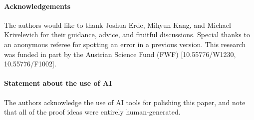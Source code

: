 \documentclass[notitlepage]{scrartcl}
\begin{document}
\paragraph{Acknowledgements}
The authors would like to thank Joshua Erde, Mihyun Kang, and Michael Krivelevich for their guidance, advice, and fruitful discussions.
Special thanks to an anonymous referee for spotting an error in a previous version.
This research was funded in part by the Austrian Science Fund (FWF) [10.55776/W1230, 10.55776/F1002].
\paragraph{Statement about the use of AI}
The authors acknowledge the use of AI tools for polishing this paper, and note that all of the proof ideas were entirely human-generated.

\begingroup
{}


\endgroup
\end{document}
